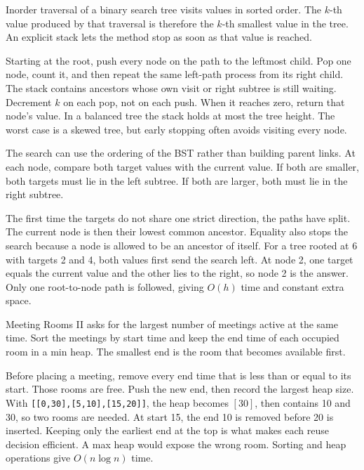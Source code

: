 \expandafter\def\csname sourcewalkthrough@35\endcsname{%
Inorder traversal of a binary search tree visits values in sorted order. The
\(k\)-th value produced by that traversal is therefore the \(k\)-th smallest
value in the tree. An explicit stack lets the method stop as soon as that
value is reached.

Starting at the root, push every node on the path to the leftmost child. Pop
one node, count it, and then repeat the same left-path process from its right
child. The stack contains ancestors whose own visit or right subtree is still
waiting. Decrement \(k\) on each pop, not on each push. When it reaches zero,
return that node's value. In a balanced tree the stack holds at most the tree
height. The worst case is a skewed tree, but early stopping often avoids
visiting every node.}

\expandafter\def\csname sourcewalkthrough@36\endcsname{%
The search can use the ordering of the BST rather than building parent links.
At each node, compare both target values with the current value. If both are
smaller, both targets must lie in the left subtree. If both are larger, both
must lie in the right subtree.

The first time the targets do not share one strict direction, the paths have
split. The current node is then their lowest common ancestor. Equality also
stops the search because a node is allowed to be an ancestor of itself. For a
tree rooted at 6 with targets 2 and 4, both values first send the search left.
At node 2, one target equals the current value and the other lies to the right,
so node 2 is the answer. Only one root-to-node path is followed, giving
\(O(h)\) time and constant extra space.}

\expandafter\def\csname sourcewalkthrough@37\endcsname{%
Meeting Rooms II asks for the largest number of meetings active at the same
time. Sort the meetings by start time and keep the end time of each occupied
room in a min heap. The smallest end is the room that becomes available first.

Before placing a meeting, remove every end time that is less than or equal to
its start. Those rooms are free. Push the new end, then record the largest heap
size. With \texttt{[[0,30],[5,10],[15,20]]}, the heap becomes \([30]\), then
contains 10 and 30, so two rooms are needed. At start 15, the end 10 is
removed before 20 is inserted. Keeping only the earliest end at the top is
what makes each reuse decision efficient. A max heap would expose the wrong
room. Sorting and heap operations give \(O(n\log n)\) time.}

